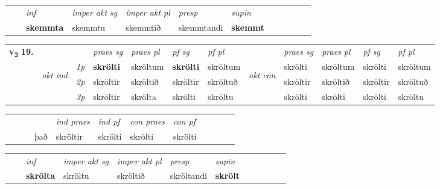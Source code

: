 \begin{tabular}{llllllllllll}
 & & \textit{inf} & \textit{imper akt sg} & \textit{imper akt pl}   & \textit{presp} & \textit{supin}       \\*
  & & \textbf{skemmta} & skemmtu  & skemmtið   & skemmtandi &  \textbf{skemmt}   \\*
\cmidrule{1-12}
\end{tabular}



\begin{tabular}{llllllllllll} \toprule
\multirow{4}{*}{{{\textbf{v{\textsubscript{2}}} \Large{\textbf{19.}}}}}  & &   &  \textit{praes sg}  & \textit{praes pl}  &\textit{ pf sg} & \textit{pf pl} &  &  \textit{praes sg}  & \textit{praes pl}  & \textit{pf sg} & \textit{pf pl } \\*
	\cmidrule{4-7} \cmidrule{9-12}
 & \multirow{3}{*}{\begin{turn}{90}\textit{akt ind}\end{turn}} & {\textit{1p}} & \textbf{skrölti} & skröltum    & \textbf{skrölti} & skröltum & \multirow{3}{*}{\begin{turn}{90}\textit{akt con}\end{turn}} &skrölti & skröltum & skrölti & skröltum\\*
& &  {\textit{2p}} &  skröltir  & skröltið   & skröltir & skröltuð & & skröltir & skröltið & skröltir & skröltuð \\*
& &  {\textit{3p}} & skröltir & skrölta   & skrölti & skröltu & & skrölti & skrölti& skrölti & skröltu  \\*
\cmidrule{4-7} \cmidrule{9-12}
\end{tabular}


\begin{tabular}{llllllllllll}
 & &  & &  \textit{ind praes} & \textit{ind pf} & \textit{con praes} & \textit{con pf} \\*
&  & & það & skröltir & skrölti & skrölti & skrölti \\*
\cmidrule{5-9}
\end{tabular}


\begin{tabular}{llllllllllll}
 & & \textit{inf} & \textit{imper akt sg} & \textit{imper akt pl}   & \textit{presp} & \textit{supin}       \\*
  & & \textbf{skrölta} & skröltu  & skröltið   & skröltandi &  \textbf{skrölt}   \\*
\cmidrule{1-12}
\end{tabular}



